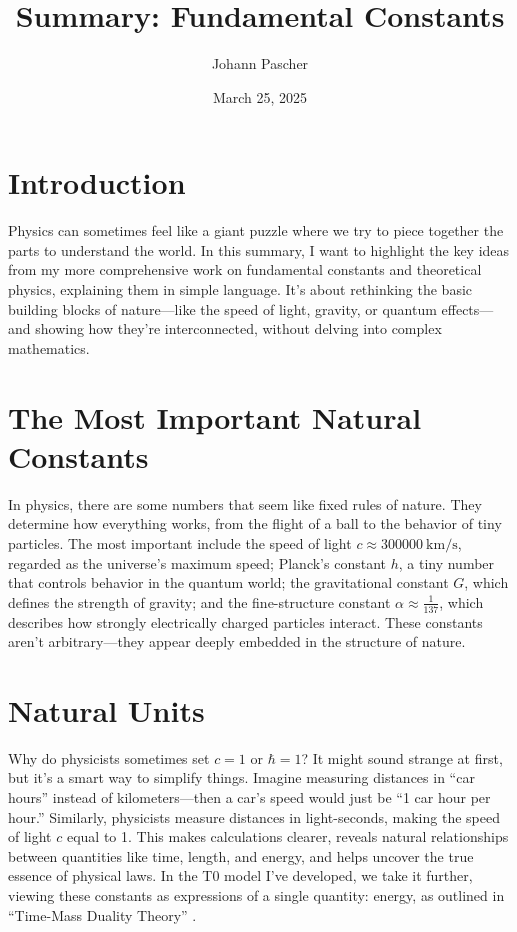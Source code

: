 \documentclass[a4paper,12pt]{article}
\title{Summary: Fundamental Constants}
\author{Johann Pascher}
\date{March 25, 2025}
\begin{document}
	
	\maketitle
	
	\section{Introduction}
	
	Physics can sometimes feel like a giant puzzle where we try to piece together the parts to understand the world. In this summary, I want to highlight the key ideas from my more comprehensive work on fundamental constants and theoretical physics, explaining them in simple language. It’s about rethinking the basic building blocks of nature—like the speed of light, gravity, or quantum effects—and showing how they’re interconnected, without delving into complex mathematics.
	
	\section{The Most Important Natural Constants}
	
	In physics, there are some numbers that seem like fixed rules of nature. They determine how everything works, from the flight of a ball to the behavior of tiny particles. The most important include the speed of light \(c \approx \SI{300000}{\kilo\meter\per\second}\), regarded as the universe’s maximum speed; Planck’s constant \(h\), a tiny number that controls behavior in the quantum world; the gravitational constant \(G\), which defines the strength of gravity; and the fine-structure constant \(\alpha \approx \frac{1}{137}\), which describes how strongly electrically charged particles interact. These constants aren’t arbitrary—they appear deeply embedded in the structure of nature.
	
	\section{Natural Units}
	
	Why do physicists sometimes set \(c = 1\) or \(\hbar = 1\)? It might sound strange at first, but it’s a smart way to simplify things. Imagine measuring distances in “car hours” instead of kilometers—then a car’s speed would just be “1 car hour per hour.” Similarly, physicists measure distances in light-seconds, making the speed of light \(c\) equal to 1. This makes calculations clearer, reveals natural relationships between quantities like time, length, and energy, and helps uncover the true essence of physical laws. In the T0 model I’ve developed, we take it further, viewing these constants as expressions of a single quantity: energy, as outlined in “Time-Mass Duality Theory” \cite{pascher_params_2025}.
	
\end{document}
